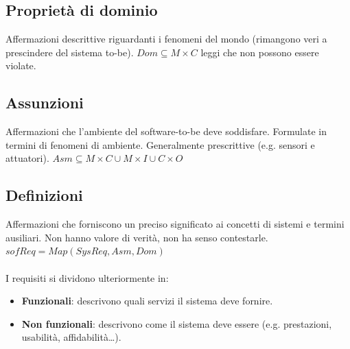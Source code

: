 \documentclass[../main.tex]{subfiles}
\begin{document}
\subsection{Proprietà di dominio}
Affermazioni descrittive riguardanti i fenomeni del mondo (rimangono veri a prescindere del sistema to-be).
$Dom\subseteq M\times C$ leggi che non possono essere violate.
\subsection{Assunzioni}
Affermazioni che l'ambiente del software-to-be deve soddisfare. Formulate in termini di fenomeni di ambiente. Generalmente prescrittive (e.g. sensori e attuatori).
$Asm\subseteq M\times C \cup M\times I \cup C \times O$
\subsection{Definizioni}
Affermazioni che forniscono un preciso significato ai concetti di sistemi e termini ausiliari.
Non hanno valore di verità, non ha senso contestarle.
$sofReq=Map(SysReq, Asm, Dom)$
\\ \\
I requisiti si dividono ulteriormente in:
\begin{itemize}
	\item \textbf{Funzionali}: descrivono quali servizi il sistema deve fornire.
	\item \textbf{Non funzionali}: descrivono come il sistema deve essere (e.g. prestazioni, usabilità, affidabilità\dots).
\end{itemize}
\end{document}
